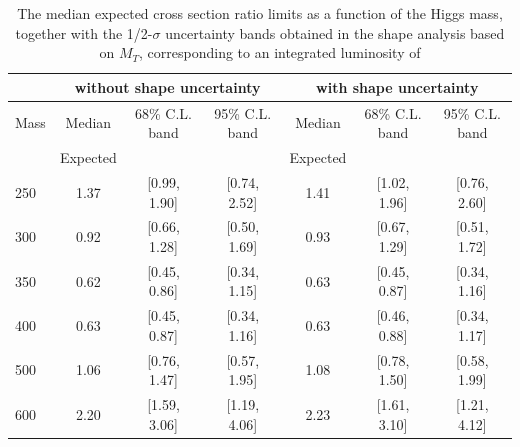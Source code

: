 \begin{table}
\begin{center}
{\normalsize
\begin{tabular}{|l|c|c|c|c|c|c|}
\hline
      &  \multicolumn{3}{c|}{ without shape uncertainty} &\multicolumn{3}{c|}{ with shape uncertainty} \\
\hline
Mass  &  Median      &     68\% C.L. band &  95\% C.L. band &  Median	   &	 68\% C.L. band &  95\% C.L. band\\
      &  Expected    &                    &                 &  Expected    &			&		 \\
\hline
250 & 1.37 & [0.99, 1.90] & [0.74, 2.52] & 1.41 & [1.02, 1.96] & [0.76, 2.60] \\
300 & 0.92 & [0.66, 1.28] & [0.50, 1.69] & 0.93 & [0.67, 1.29] & [0.51, 1.72] \\
350 & 0.62 & [0.45, 0.86] & [0.34, 1.15] & 0.63 & [0.45, 0.87] & [0.34, 1.16] \\
400 & 0.63 & [0.45, 0.87] & [0.34, 1.16] & 0.63 & [0.46, 0.88] & [0.34, 1.17] \\
500 & 1.06 & [0.76, 1.47] & [0.57, 1.95] & 1.08 & [0.78, 1.50] & [0.58, 1.99] \\
600 & 2.20 & [1.59, 3.06] & [1.19, 4.06] & 2.23 & [1.61, 3.10] & [1.21, 4.12] \\
\hline
\end{tabular}
}
\end{center}
\caption{The median expected cross section ratio limits as a function 
of the Higgs mass, together with the 1/2-$\sigma$ uncertainty bands obtained in the shape analysis based on $M_T$, 
corresponding to an integrated luminosity of \intlumi}
\label{tab:limits_mtshape_5fb_detail}
\end{table}

